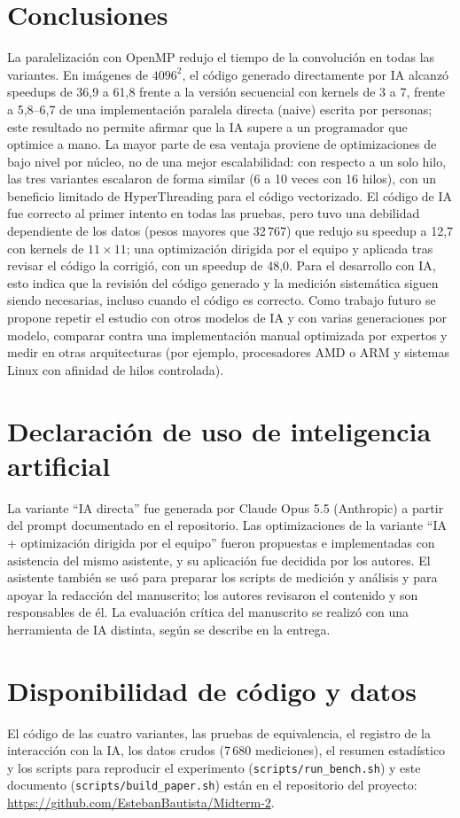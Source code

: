 \documentclass[12pt]{article}
\begin{document}
\section{Conclusiones}
La paralelización con OpenMP redujo el tiempo de la convolución en todas las variantes. En imágenes de $4096^2$, el código generado directamente por IA alcanzó speedups de 36,9 a 61,8 frente a la versión secuencial con kernels de 3 a 7, frente a 5,8--6,7 de una implementación paralela directa (naive) escrita por personas; este resultado no permite afirmar que la IA supere a un programador que optimice a mano. La mayor parte de esa ventaja proviene de optimizaciones de bajo nivel por núcleo, no de una mejor escalabilidad: con respecto a un solo hilo, las tres variantes escalaron de forma similar (6 a 10 veces con 16 hilos), con un beneficio limitado de HyperThreading para el código vectorizado. El código de IA fue correcto al primer intento en todas las pruebas, pero tuvo una debilidad dependiente de los datos (pesos mayores que 32\,767) que redujo su speedup a 12,7 con kernels de $11\times11$; una optimización dirigida por el equipo y aplicada tras revisar el código la corrigió, con un speedup de 48,0. Para el desarrollo con IA, esto indica que la revisión del código generado y la medición sistemática siguen siendo necesarias, incluso cuando el código es correcto. Como trabajo futuro se propone repetir el estudio con otros modelos de IA y con varias generaciones por modelo, comparar contra una implementación manual optimizada por expertos y medir en otras arquitecturas (por ejemplo, procesadores AMD o ARM y sistemas Linux con afinidad de hilos controlada).

\section*{Declaración de uso de inteligencia artificial}
La variante ``IA directa'' fue generada por Claude Opus 5.5 (Anthropic) a partir del prompt documentado en el repositorio. Las optimizaciones de la variante ``IA + optimización dirigida por el equipo'' fueron propuestas e implementadas con asistencia del mismo asistente, y su aplicación fue decidida por los autores. El asistente también se usó para preparar los scripts de medición y análisis y para apoyar la redacción del manuscrito; los autores revisaron el contenido y son responsables de él. La evaluación crítica del manuscrito se realizó con una herramienta de IA distinta, según se describe en la entrega.

\section*{Disponibilidad de código y datos}
El código de las cuatro variantes, las pruebas de equivalencia, el registro de la interacción con la IA, los datos crudos (7\,680 mediciones), el resumen estadístico y los scripts para reproducir el experimento (\texttt{scripts/run\_bench.sh}) y este documento (\texttt{scripts/build\_paper.sh}) están en el repositorio del proyecto: \ifdefined{}\else\url{https://github.com/EstebanBautista/Midterm-2}\fi.
\end{document}
